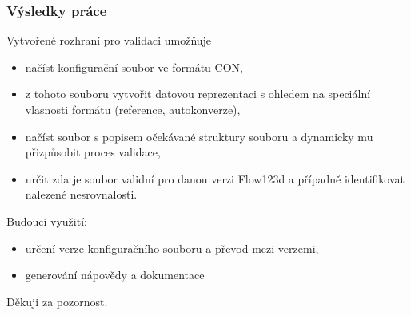 \documentclass{beamer}
\begin{document}
\begin{frame}
	\frametitle{Výsledky práce}
	Vytvořené rozhraní pro validaci umožňuje
	\begin{itemize}
		\item načíst konfigurační soubor ve formátu CON,
		\item z tohoto souboru vytvořit datovou reprezentaci s ohledem na
		speciální vlasnosti formátu (reference, autokonverze),
		\item načíst soubor s popisem očekávané struktury souboru a dynamicky mu přizpůsobit proces validace,
		\item určit zda je soubor validní pro danou verzi Flow123d a případně identifikovat nalezené nesrovnalosti.
	\end{itemize}
	Budoucí využití:
	\begin{itemize}
		\item určení verze konfiguračního souboru a převod mezi verzemi,
		\item generování nápovědy a dokumentace
	\end{itemize}
\end{frame}


\begin{frame}{}{}
\begin{center}
\huge Děkuji za pozornost.
\end{center}
\end{frame}
\end{document}
